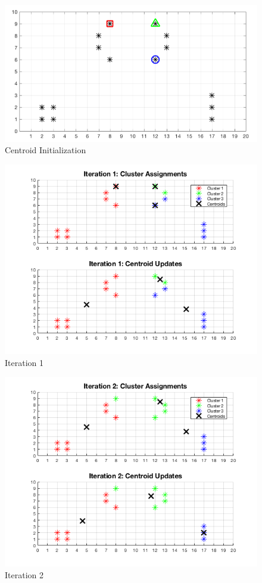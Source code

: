 \documentclass[english]{article}
\begin{document}
\begin{enumerate}
    \begin{figure}[H]
    \centering
    \includegraphics[scale = 0.5]{init_b}
    \caption{Centroid Initialization}
    \label{fig:init_b}
    \end{figure}
    
    \begin{figure}[H]
    \centering
    \includegraphics[scale = 0.85]{iter1_b}
    \caption{Iteration 1}
    \label{fig:iter1_b}
    \end{figure}
    
    \begin{figure}[H]
    \centering
    \includegraphics[scale = 0.85]{iter2_b}
    \caption{Iteration 2}
    \end{figure}
    

\end{enumerate}
\end{document}
